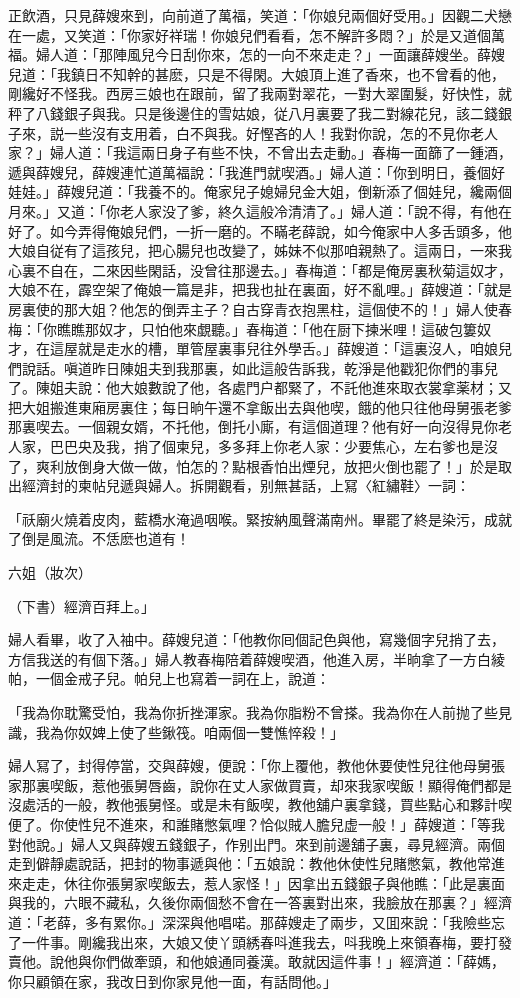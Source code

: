 正飲酒，只見薛嫂來到，向前道了萬福，笑道：「你娘兒兩個好受用。」因觀二犬戀在一處，又笑道：「你家好祥瑞！你娘兒們看看，怎不解許多悶？」於是又道個萬福。婦人道：「那陣風兒今日刮你來，怎的一向不來走走？」一面讓薛嫂坐。薛嫂兒道：「我鎮日不知幹的甚麽，只是不得閑。大娘頂上進了香來，也不曾看的他，剛纔好不怪我。西房三娘也在跟前，留了我兩對翠花，一對大翠圍髮，好快性，就秤了八錢銀子與我。只是後邊住的雪姑娘，従八月裏要了我二對線花兒，該二錢銀子來，説一些沒有支用着，白不與我。好慳吝的人！我對你說，怎的不見你老人家？」婦人道：「我這兩日身子有些不快，不曾出去走動。」春梅一面篩了一鍾酒，遞與薛嫂兒，薛嫂連忙道萬福說：「我進門就喫酒。」婦人道：「你到明日，養個好娃娃。」薛嫂兒道：「我養不的。俺家兒子媳婦兒金大姐，倒新添了個娃兒，纔兩個月來。」又道：「你老人家没了爹，終久這般冷清清了。」婦人道：「說不得，有他在好了。如今弄得俺娘兒們，一折一磨的。不瞞老薛說，如今俺家中人多舌頭多，他大娘自従有了這孩兒，把心腸兒也改變了，姊妹不似那咱親熱了。這兩日，一來我心裏不自在，二來因些閑話，没曾往那邊去。」春梅道：「都是俺房裏秋菊這奴才，大娘不在，霹空架了俺娘一篇是非，把我也扯在裏面，好不亂哩。」薛嫂道：「就是房裏使的那大姐？他怎的倒弄主子？自古穿青衣抱黑柱，這個使不的！」婦人使春梅：「你瞧瞧那奴才，只怕他來覷聽。」春梅道：「他在厨下揀米哩！這破包簍奴才，在這屋就是走水的槽，單管屋裏事兒往外學舌。」薛嫂道：「這裏沒人，咱娘兒們說話。嗔道昨日陳姐夫到我那裏，如此這般告訴我，乾淨是他戳犯你們的事兒了。陳姐夫說：他大娘數說了他，各處門户都緊了，不託他進來取衣裳拿薬材；又把大姐搬進東廂房裏住；每日晌午還不拿飯出去與他喫，餓的他只往他母舅張老爹那裏喫去。一個親女婿，不托他，倒托小廝，有這個道理？他有好一向沒得見你老人家，巴巴央及我，捎了個柬兒，多多拜上你老人家：少要焦心，左右爹也是沒了，爽利放倒身大做一做，怕怎的？點根香怕出煙兒，放把火倒也罷了！」於是取出經濟封的柬帖兒遞與婦人。拆開觀看，别無甚話，上冩〈紅繡鞋〉一詞：

「祅廟火燒着皮肉，藍橋水淹過咽喉。緊按納風聲滿南州。畢罷了終是染污，成就了倒是風流。不恁麽也道有！

六姐（妝次）

（下書）經濟百拜上。」

婦人看畢，收了入袖中。薛嫂兒道：「他教你囘個記色與他，寫幾個字兒捎了去，方信我送的有個下落。」婦人教春梅陪着薛嫂喫酒，他進入房，半晌拿了一方白綾帕，一個金戒子兒。帕兒上也寫着一詞在上，說道：

「我為你耽驚受怕，我為你折挫渾家。我為你脂粉不曾搽。我為你在人前抛了些見識，我為你奴婢上使了些鍬筏。咱兩個一雙憔悴殺！」

婦人冩了，封得停當，交與薛嫂，便說：「你上覆他，教他休要使性兒往他母舅張家那裏喫飯，惹他張舅唇齒，說你在丈人家做買賣，却來我家喫飯！顯得俺們都是沒處活的一般，教他張舅怪。或是未有飯喫，教他舖户裏拿錢，買些點心和夥計喫便了。你使性兒不進來，和誰賭憋氣哩？恰似賊人膽兒虚一般！」薛嫂道：「等我對他說。」婦人又與薛嫂五錢銀子，作别出門。來到前邊舖子裏，尋見經濟。兩個走到僻靜處說話，把封的物事遞與他：「五娘說：教他休使性兒賭憋氣，教他常進來走走，休往你張舅家喫飯去，惹人家怪！」因拿出五錢銀子與他瞧：「此是裏面與我的，六眼不藏私，久後你兩個愁不會在一答裏對出來，我臉放在那裏？」經濟道：「老薛，多有累你。」深深與他唱喏。那薛嫂走了兩步，又囬來說：「我險些忘了一件事。剛纔我出來，大娘又使丫頭綉春呌進我去，呌我晚上來領春梅，要打發賣他。說他與你們做牽頭，和他娘通同養漢。敢就因這件事！」經濟道：「薛媽，你只顧領在家，我改日到你家見他一面，有話問他。」

